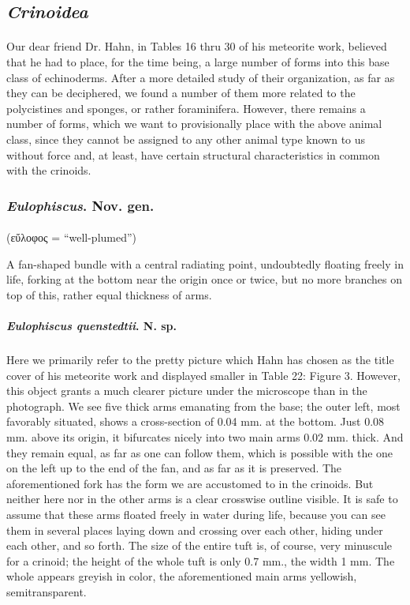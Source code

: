 \documentclass[a4paper, 12pt, oneside]{article}
\begin{document}
\subsection{\emph{Crinoidea}}
\paragraph*{}
Our dear friend Dr. Hahn, in Tables 16 thru 30 of his meteorite work, believed that he had to place, for the time being, a large number of forms into this base class of echinoderms. After a more detailed study of their organization, as far as they can be deciphered, we found a number of them more related to the polycistines and sponges, or rather foraminifera. However, there remains a number of forms, which we want to provisionally place with the above animal class, since they cannot be assigned to any other animal type known to us without force and, at least, have certain structural characteristics in common with the crinoids.
\subsubsection{\emph{Eulophiscus}. Nov. gen.}
\paragraph*{}
(εὔλοφος = ``well-plumed'')%

A fan-shaped bundle with a central radiating point, undoubtedly floating freely in life, forking at the bottom near the origin once or twice, but no more branches on top of this, rather equal thickness of arms.
\paragraph{\emph{Eulophiscus quenstedtii}. N. sp.}
\subparagraph{}
Here we primarily refer to the pretty picture which Hahn has chosen as the title cover of his meteorite work and displayed smaller in Table 22: Figure 3. However, this object grants a much clearer picture under the microscope than in the photograph. We see five thick arms emanating from the base; the outer left, most favorably situated, shows a cross-section of 0.04 mm. at the bottom. Just 0.08 mm. above its origin, it bifurcates nicely into two main arms 0.02 mm. thick. And they remain equal, as far as one can follow them, which is possible with the one on the left up to the end of the fan, and as far as it is preserved. The aforementioned fork has the form we are accustomed to in the crinoids. But neither here nor in the other arms is a clear crosswise outline visible. It is safe to assume that these arms floated freely in water during life, because you can see them in several places laying down and crossing over each other, hiding under each other, and so forth. The size of the entire tuft is, of course, very minuscule for a crinoid; the height of the whole tuft is only 0.7 mm., the width 1 mm. The whole appears greyish in color, the aforementioned main arms yellowish, semitransparent.
\end{document}
